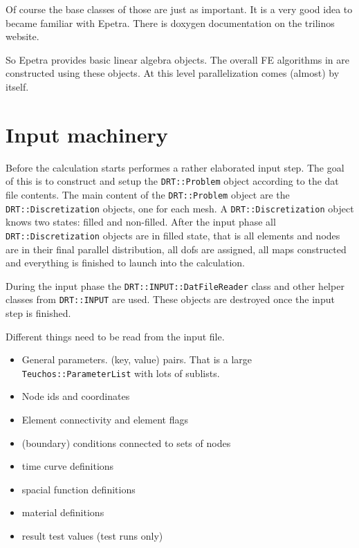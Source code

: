Of course the base classes of those are just as important. It is a very good
idea to became familiar with Epetra. There is doxygen documentation on the
trilinos website.

So Epetra provides basic linear algebra objects. The overall FE algorithms in
\baci{} are constructed using these objects. At this level parallelization
comes (almost) by itself.

\section{Input machinery}

Before the calculation starts \baci{} performes a rather elaborated input
step. The goal of this is to construct and setup the \texttt{DRT::Problem}
object according to the dat file contents. The main content of the
\texttt{DRT::Problem} object are the \texttt{DRT::Discretization} objects, one
for each mesh. A \texttt{DRT::Discretization} object knows two states: filled
and non-filled. After the input phase all \texttt{DRT::Discretization} objects
are in filled state, that is all elements and nodes are in their final
parallel distribution, all dofs are assigned, all maps constructed and
everything is finished to launch into the calculation.

During the input phase the
\texttt{DRT::INPUT::DatFileReader} class and other helper classes from
\texttt{DRT::INPUT} are used. These objects are destroyed once the input step
is finished.

Different things need to be read from the input file.

\begin{itemize}

\item General parameters. (key, value) pairs. That is a large
\texttt{Teuchos::ParameterList} with lots of sublists.

\item Node ids and coordinates

\item Element connectivity and element flags

\item (boundary) conditions connected to sets of nodes

\item time curve definitions

\item spacial function definitions

\item material definitions

\item result test values (test runs only)

\end{itemize}

